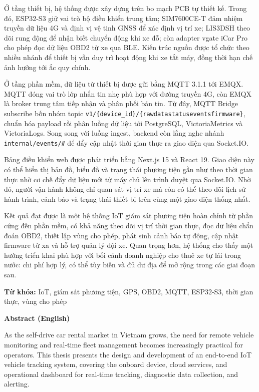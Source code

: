 \documentclass[a4paper]{extarticle}
\begin{document}
Ở tầng thiết bị, hệ thống được xây dựng trên bo mạch PCB tự thiết kế.
Trong đó, ESP32-S3 giữ vai trò bộ điều khiển trung tâm; SIM7600CE-T đảm
nhiệm truyền dữ liệu 4G và định vị vệ tinh GNSS để xác định vị trí xe;
LIS3DSH theo dõi rung động để nhận biết chuyển động khi xe đỗ; còn
adapter vgate iCar Pro cho phép đọc dữ liệu OBD2 từ xe qua BLE. Kiến
trúc nguồn được tổ chức theo nhiều
nhánh để thiết bị vẫn duy trì hoạt động khi xe tắt máy, đồng thời hạn
chế ảnh hưởng tới ắc quy chính.

Ở tầng phần mềm, dữ liệu từ thiết bị được gửi bằng MQTT 3.1.1 tới EMQX.
MQTT đóng vai trò lớp nhắn tin nhẹ phù hợp với đường truyền 4G, còn EMQX
là broker trung tâm tiếp nhận và phân phối bản tin. Từ đây, MQTT Bridge
subscribe bốn nhóm topic
\texttt{v1/\{device\_id\}/\{rawdata\textbar status\textbar events\textbar firmware\}},
chuẩn hóa payload rồi phân luồng dữ liệu tới PostgreSQL,
VictoriaMetrics và VictoriaLogs. Song song với luồng ingest, backend còn
lắng nghe nhánh \texttt{internal/events/\#} để đẩy cập nhật thời gian
thực ra giao diện qua Socket.IO.

Bảng điều khiển web được phát triển bằng Next.js 15 và React 19. Giao
 diện này có thể hiển thị bản đồ, biểu đồ và trạng thái phương tiện gần
như theo thời gian thực nhờ cơ chế đẩy dữ liệu mới từ máy chủ lên trình
duyệt qua Socket.IO. Nhờ đó, người vận hành không chỉ quan sát vị trí xe
mà còn có thể theo dõi lịch sử hành trình, cảnh báo và trạng thái thiết
bị trên cùng một giao diện thống nhất.

Kết quả đạt được là một hệ thống IoT giám sát phương tiện hoàn chỉnh từ
phần cứng đến phần mềm, có khả năng theo dõi vị trí thời gian thực, đọc
dữ liệu chẩn đoán OBD2, thiết lập vùng cho phép, phát sinh cảnh báo tự
động, cập nhật firmware từ xa và hỗ trợ quản lý đội xe. Quan trọng hơn,
hệ thống cho thấy một hướng triển khai phù hợp với bối cảnh doanh nghiệp
cho thuê xe tự lái trong nước: chi phí hợp lý, có thể tùy biến và đủ dư
địa để mở rộng trong các giai đoạn sau.

\textbf{Từ khóa:} IoT, giám sát phương tiện, GPS, OBD2, MQTT, ESP32-S3,
thời gian thực, vùng cho phép

\textbf{Abstract (English)}

As the self-drive car rental market in Vietnam grows, the need for
remote vehicle monitoring and real-time fleet management becomes
increasingly practical for operators. This thesis presents the design
and development of an end-to-end IoT vehicle tracking system, covering
the onboard device, cloud services, and operational dashboard for
real-time tracking, diagnostic data collection, and alerting.
\end{document}
